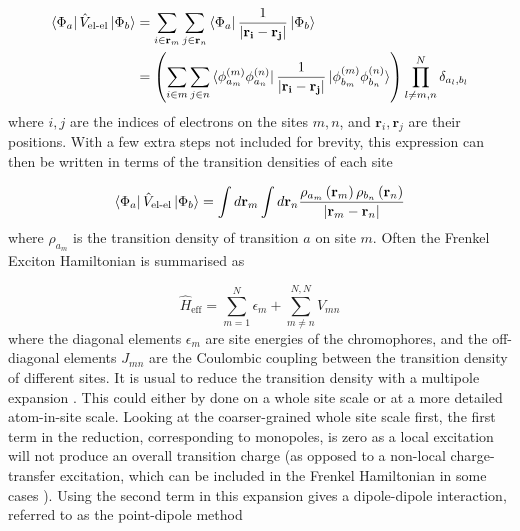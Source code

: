 \begin{equation}
\begin{aligned}
\bra{\Phi_a} \hat{V}_{\text{el-el}}\ket{\Phi_b} &= \sum_{i \in \mathbf{r}_m} \sum_{j \in \mathbf{r}_n} \bra{\Phi_a} \frac{1}{\left|\mathbf{r_i} - \mathbf{r_j}\right|} \ket{\Phi_b} \\
&= \left(\sum_{i \in m} \sum_{j \in n} \bra{\phi^{\left(m\right)}_{a_m} \phi^{\left(n\right)}_{a_n}} \frac{1}{\left|\mathbf{r_i} - \mathbf{r_j}\right|} \ket{\phi^{\left(m\right)}_{b_m}\phi^{\left(n\right)}_{b_n}}\right)\prod^N_{l\neq m,n}\delta_{a_l, b_l}
\end{aligned}
\end{equation}
%
where $i,j$ are the indices of electrons on the sites $m,n$, and $\mathbf{r}_i, 
\mathbf{r}_j$ are their positions. With a few extra steps not included for brevity,
this expression can then be written in terms of the transition densities of each 
site\cite{Scholes2003}

\begin{equation}
\label{eq:coupling_density}
\bra{\Phi_a} \hat{V}_{\text{el-el}}\ket{\Phi_b} = \int d\mathbf{r}_{m} \int d\mathbf{r}_{n} \frac{\rho_{a_m}\left(\mathbf{r}_{m}\right)\rho_{b_n}\left(\mathbf{r}_{n}\right)}{\left|\mathbf{r}_{m} - \mathbf{r}_{n}\right|}
\end{equation}
%
where $\rho_{a_m}$ is the transition density of transition $a$ on site $m$. Often
the Frenkel Exciton Hamiltonian is summarised as

\begin{equation}
\hat{H}_{\text{eff}} = \sum^N_{m=1} \epsilon_m + \sum^{N,N}_{m \neq n} V_{mn}
\end{equation}
%
where the diagonal elements $\epsilon_m$ are site energies of the chromophores, 
and the off-diagonal elements $J_{mn}$ are the Coulombic coupling between the transition
density of different sites. It is usual to reduce the transition density with a 
multipole expansion \cite{Steinmann2015}. This could either by done on a whole site
scale or at a more detailed atom-in-site scale. Looking at the coarser-grained whole
site scale first, the first term in the reduction, corresponding to monopoles, is
zero as a local excitation will not produce an overall transition charge (as opposed 
to a non-local charge-transfer excitation, which can be included in the Frenkel 
Hamiltonian in some cases \cite{Li2017}). Using the second term in this expansion 
gives a dipole-dipole interaction, referred to as the point-dipole method

